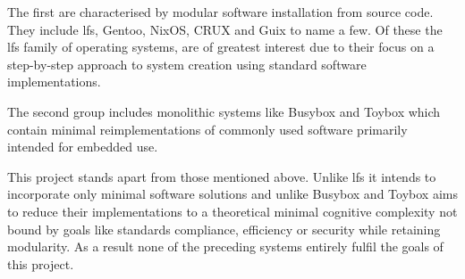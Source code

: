 The first are characterised by modular software installation from source code. They include \gls{lfs}, Gentoo, NixOS, CRUX and  Guix to name a few. Of these the \gls{lfs} family of operating systems, are of greatest interest due to their focus on a step-by-step approach to system creation using standard software implementations. 

The second group includes monolithic systems like Busybox and Toybox which contain minimal reimplementations of commonly used software primarily intended for embedded use.

This project stands apart from those mentioned above. Unlike \gls{lfs} it intends to incorporate only minimal software solutions and unlike Busybox and Toybox aims to reduce their implementations to a theoretical minimal cognitive complexity not bound by goals like standards compliance, efficiency or security while retaining modularity. As a result none of the preceding systems entirely fulfil the goals of this project.
